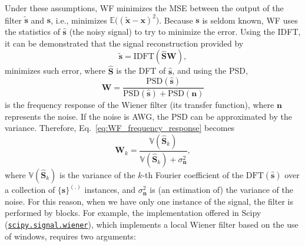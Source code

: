 Under these assumptions, \gls{WF} minimizes the \gls{MSE} between the
output of the filter $\tilde{\mathbf{s}}$ and $\mathbf{s}$, i.e.,
minimizes $\mathbb{E}\big((\tilde{\mathbf{x}} -
\mathbf{x})^2\big)$. Because $\mathbf{s}$ is seldom known, \gls{WF}
uses the statistics of $\hat{\mathbf{s}}$ (the noisy signal) to try to
minimize the error. Using the \gls{IDFT}, it can be demonstrated
\cite{wiener1942extrapolation} that the signal reconstruction provided
by
\begin{equation}
  \tilde{\mathbf{s}} = \text{IDFT}(\hat{\mathbf{S}}\mathbf{W}),
  \label{eq:WF}
\end{equation}
minimizes such error, where $\hat{\mathbf{S}}$ is the \gls{DFT} of
$\hat{\mathbf{s}}$, and using the \gls{PSD},
\begin{equation}
  \mathbf{W} = \frac{\text{PSD}(\hat{\mathbf{s}})}{\text{PSD}(\hat{\mathbf{s}}) + \text{PSD}(\mathbf{n})}
  \label{eq:WF_frequency_response}
\end{equation}
is the frequency response of the Wiener filter (its transfer
function), where $\mathbf{n}$ represents the noise. If the noise is
\gls{AWG}, the \gls{PSD} can be approximated by the
variance. Therefore, Eq.~\ref{eq:WF_frequency_response} becomes
\begin{equation}
  \mathbf{W}_k = \frac{\mathbb{V}(\hat{\mathbf{S}}_k)}{\mathbb{V}(\hat{\mathbf{S}}_k) + \sigma^2_{\mathbf{n}}},
  \label{eq:WF_coeffs}
\end{equation}
where $\mathbb{V}(\hat{\mathbf{S}}_k)$ is the variance of the $k$-th
Fourier coefficient of the $\text{DFT}(\hat{\mathbf{s}})$ over a
collection of $\{\hat{\mathbf{s}}\}^{(.)}$ instances, and
$\sigma^2_{\mathbf{n}}$ is (an estimation of) the variance of the
noise. For this reason, when we have only one instance of the signal,
the filter is performed by blocks. For example, the implementation
offered in Scipy
(\href{https://docs.scipy.org/doc/scipy/reference/generated/scipy.signal.wiener.html}{\texttt{scipy.signal.wiener}}),
which implements a local Wiener filter based on the use of windows,
requires two arguments:

